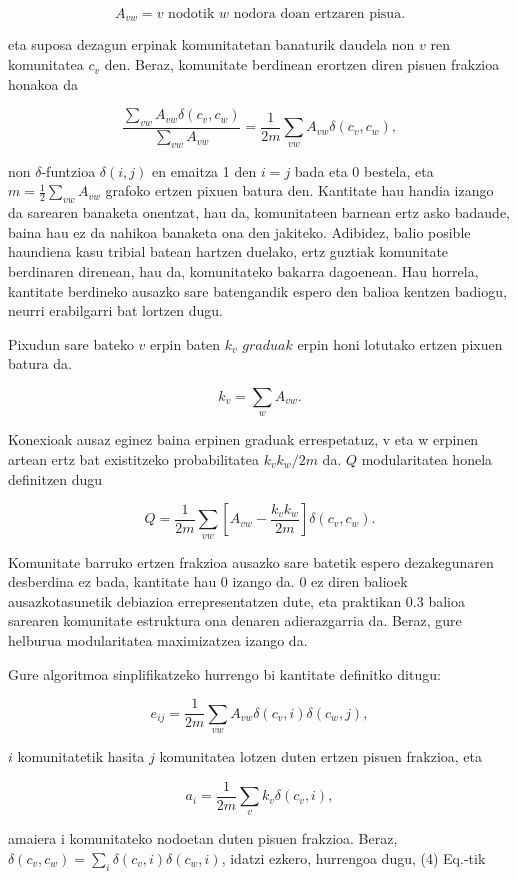 \documentclass[sigconf]{acmart}
\begin{document}
$$A_{vw} = \text{$v$ nodotik $w$ nodora doan ertzaren pisua}.$$

eta suposa dezagun erpinak komunitatetan banaturik daudela non $v$ ren komunitatea $c_v$ den. Beraz, komunitate berdinean erortzen diren pisuen frakzioa honakoa da 

$$\frac{\sum_{vw}A_{vw}\delta(c_v,c_w)}{\sum_{vw}A_{vw}}=\frac{1}{2m}\sum_{vw}A_{vw}\delta(c_v,c_w),$$

non $\delta$-funtzioa $\delta(i, j)$ en emaitza 1 den $i = j$ bada eta 0 bestela, eta $m = \frac{1}{2}\sum_{vw}A_{vw}$ grafoko ertzen pixuen batura den. Kantitate hau handia izango da sarearen banaketa onentzat, hau da, komunitateen barnean ertz asko badaude, baina hau ez da nahikoa banaketa ona den jakiteko. Adibidez, balio posible haundiena kasu tribial batean hartzen duelako, ertz guztiak komunitate berdinaren direnean, hau da, komunitateko bakarra dagoenean. Hau horrela, kantitate berdineko ausazko sare batengandik espero den balioa kentzen badiogu, neurri erabilgarri bat lortzen dugu.

Pixudun sare bateko $v$ erpin baten $k_{v}$ $graduak$ erpin honi lotutako ertzen pixuen batura da.

$$k_v = \sum_{w}A_{vw}.$$

Konexioak ausaz eginez baina erpinen graduak errespetatuz,  v eta w erpinen artean ertz bat existitzeko probabilitatea $k_{v}k_{w}/2m$ da. $Q$ modularitatea honela definitzen dugu

$$Q=\frac{1}{2m}\sum_{vw}\left[A_{vw}-\frac{k_vk_w}{2m}\right]\delta(c_v,c_w).$$

Komunitate barruko ertzen frakzioa ausazko sare batetik espero dezakegunaren desberdina ez bada, kantitate hau 0 izango da. 0 ez diren balioek ausazkotasunetik debiazioa errepresentatzen dute, eta praktikan 0.3 balioa sarearen komunitate estruktura ona denaren adierazgarria da. Beraz, gure helburua modularitatea maximizatzea izango da.

Gure algoritmoa sinplifikatzeko hurrengo bi kantitate definitko ditugu:

$$e_{ij}=\frac{1}{2m}\sum_{vw}A_{vw}\delta(c_v,i)\delta(c_w,j),$$

$i$ komunitatetik hasita $j$ komunitatea lotzen duten ertzen pisuen frakzioa, eta

$$a_i=\frac{1}{2m}\sum_{v}k_v\delta(c_v,i),$$

amaiera i komunitateko nodoetan duten pisuen frakzioa.
Beraz, $\delta(c_v,c_w) = \sum_i\delta(c_v,i)\delta(c_w,i)$, idatzi ezkero, hurrengoa dugu, (4) Eq.-tik
\end{document}
